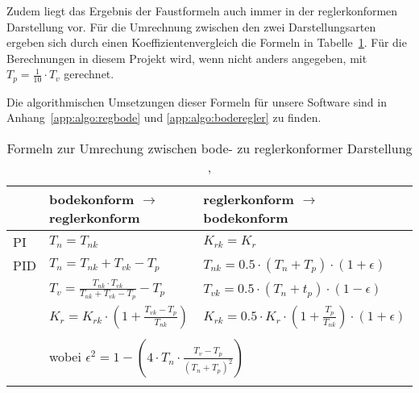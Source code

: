 Zudem   liegt   das   Ergebnis   der    Faustformeln   auch   immer   in   der
reglerkonformen  Darstellung  vor. F\"ur  die  Umrechnung  zwischen  den  zwei
Darstellungsarten ergeben sich durch  einen Koeffizientenvergleich die Formeln
in  Tabelle~\ref{tab:bode_regler_konform}.  F\"ur  die Berechnungen  in diesem
Projekt wird,  wenn nicht anders  angegeben, mit $T_p=\frac{1}{10}  \cdot T_v$
gerechnet.

Die algorithmischen Umsetzungen  dieser Formeln f\"ur unsere  Software sind in
Anhang~\ref{app:algo:regbode} und \ref{app:algo:boderegler} zu finden.

\begin{longtable}{l|ll}
    \toprule


    &
    bodekonform $\rightarrow$ reglerkonform
    &
    reglerkonform $\rightarrow$ bodekonform
    \\

    \midrule

    \endhead
    \endfoot
    \endlastfoot


    PI
    &
    $T_n = T_{nk} $ %
    &
    $K_{rk} = K_r $ %
    \\

    \midrule

    PID
    &
    $T_n = T_{nk}+T_{vk}-T_p$
    &
    $T_{nk}=0.5 \cdot (T_n+T_p) \cdot (1+\epsilon)$
    \\

    &
    $T_v=\frac{T_{nk} \cdot T_{vk}}{T_{nk}+T_{vk}-T_p}-T_p$
    &
    $T_{vk}=0.5 \cdot (T_n+t_p) \cdot (1-\epsilon)$
    \\

    &
    $K_r=K_{rk} \cdot (1 + \frac{T_{vk}-T_p}{T_{nk}})$
    &
    $K_{rk} = 0.5 \cdot K_r \cdot (1 + \frac{T_p}{T_{nk}}) \cdot (1+\epsilon )$
    \\
    \\

    &
    \multicolumn{2}{l}{wobei $\epsilon^2 = 1-(4 \cdot T_n \cdot \frac{T_v-T_p}{(T_n+T_p)^2})$}
    \\
    \bottomrule
    \caption{Formeln zur Umrechung zwischen bode- zu reglerkonformer Darstellung \cite{regelungstechnik:zellweger}, \cite{regelungstechnik:schumleon}}
    \label{tab:bode_regler_konform}
\end{longtable}


